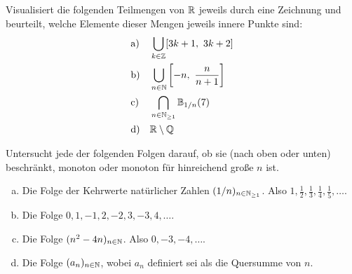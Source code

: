 \begin{aufg}
    Visualisiert die folgenden Teilmengen von $\mathbb R$ jeweils durch eine Zeichnung und beurteilt, welche Elemente dieser Mengen jeweils innere Punkte sind:
    \begin{align*}
        &\text{a)} && \bigcup_{k\in \Z} [3k+1,\ 3k+2] \\
        &\text{b)} && \bigcup_{n\in \N} \left[ -n,\ \frac{n}{n+1} \right] \\
        &\text{c)} && \bigcap_{n\in \N_{\ge 1}} \bbB_{1/n}(7) \\
        &\text{d)} && \R\setminus \Q
    \end{align*}
\end{aufg}


\begin{aufg}
    Untersucht jede der folgenden Folgen darauf, ob sie (nach oben oder unten) beschränkt, monoton oder monoton für hinreichend große $n$ ist.
    \begin{enumerate}[a)]
        \item Die Folge der Kehrwerte natürlicher Zahlen $(1/n)_{n\in \mathbb N_{\ge 1}}$. Also $1,\frac{1}{2},\frac{1}{3},\frac{1}{4},\frac{1}{5},\dots$.
        \item Die Folge $0,1,-1,2,-2,3,-3,4,\dots$.
        \item Die Folge $(n^2-4n)_{n\in \mathbb N}$. Also $0,-3,-4,\dots$.
        \item Die Folge $(a_n)_{n\in \mathbb N}$, wobei $a_n$ definiert sei als die Quersumme von $n$.
    \end{enumerate}
\end{aufg}

